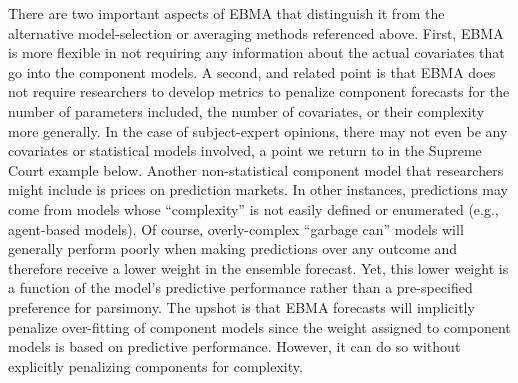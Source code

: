 There are two important aspects of EBMA that distinguish it from the
alternative model-selection or averaging methods referenced above.
First, EBMA is more flexible in not requiring any information about
the actual covariates that go into the component models. A second, and
related point is that EBMA does not require researchers to develop
metrics to penalize component forecasts for the number of parameters
included, the number of covariates, or their complexity more
generally.  In the case of subject-expert opinions, there may not even
be any covariates or statistical models involved, a point we return to
in the Supreme Court example below. Another non-statistical component
model that researchers might include is prices on prediction markets.
In other instances, predictions may come from models whose
``complexity'' is not easily defined or enumerated (e.g., agent-based
models).  Of course, overly-complex ``garbage can'' models will
generally perform poorly when making predictions over any outcome and
therefore receive a lower weight in the ensemble forecast.  Yet, this
lower weight is a function of the model's predictive performance
rather than a pre-specified preference for parsimony.  The upshot is
that EBMA forecasts will implicitly penalize over-fitting of component
models since the weight assigned to component models is based on
predictive performance.  However, it can do so without explicitly
penalizing components for complexity.



